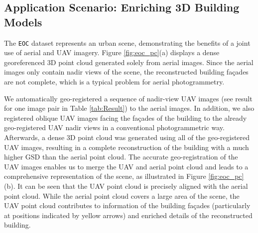 \subsection{Application Scenario: Enriching 3D Building Models}
\label{ssec:application}
The \texttt{EOC} dataset represents an urban scene, demonstrating the benefits of a joint use of aerial and UAV imagery.
Figure \ref{fig:eoc_pc}(a) displays a dense georeferenced 3D point cloud generated solely from aerial images. Since the aerial images only contain nadir views of the scene, the reconstructed building fa\c{c}ades are not complete, which is a typical problem for aerial photogrammetry.

We automatically geo-registered a sequence of nadir-view UAV images (see result for one image pair in Table \ref{tab:Result}) to the aerial images.
In addition, we also registered oblique UAV images facing the fa\c{c}ades of the building to the already geo-registered UAV nadir views in a conventional photogrammetric way.
Afterwards, a dense 3D point cloud was generated using all of the geo-registered UAV images, resulting in a complete reconstruction of the building with a much higher GSD than the aerial point cloud.
The accurate geo-registration of the UAV images enables us to merge the UAV and aerial point cloud and leads to a comprehensive representation of the scene, as illustrated in Figure \ref{fig:eoc_pc}(b).
It can be seen that the UAV point cloud is precisely aligned with the aerial point cloud.
While the aerial point cloud covers a large area of the scene, the UAV point cloud contributes to information of the building fa\c{c}ades (particularly at positions indicated by yellow arrows) and enriched details of the reconstructed building.



